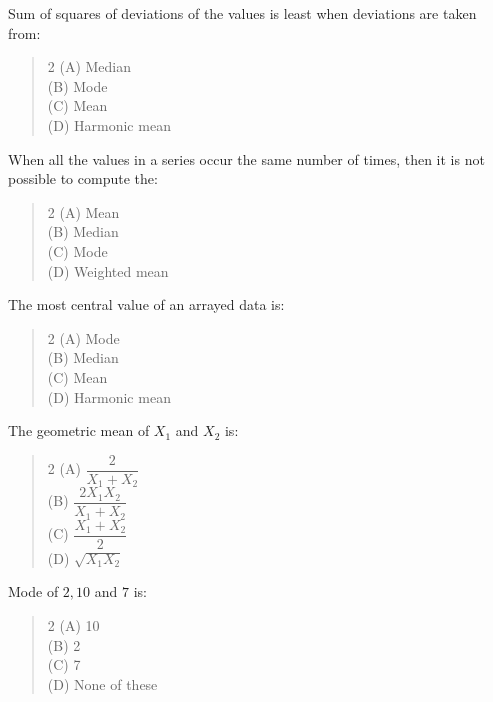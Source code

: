 \documentclass[11pt,a4paper]{article}
\begin{document}
\begin{mcqlist}
\item Sum of squares of deviations of the values is least when deviations are taken from:
\begin{quote}\begin{multicols}{2}
\noindent (A) Median \\
(B) Mode \\
(C) Mean \\
(D) Harmonic mean
\end{multicols}\end{quote}

\item When all the values in a series occur the same number of times, then it is not possible to compute the:
\begin{quote}\begin{multicols}{2}
\noindent (A) Mean \\
(B) Median \\
(C) Mode \\
(D) Weighted mean
\end{multicols}\end{quote}

\item The most central value of an arrayed data is:
\begin{quote}\begin{multicols}{2}
\noindent (A) Mode \\
(B) Median \\
(C) Mean \\
(D) Harmonic mean
\end{multicols}\end{quote}

\item The geometric mean of $X_1$ and $X_2$ is:
\begin{quote}\begin{multicols}{2}
\noindent (A) $\dfrac{2}{X_1+X_2}$ \\
(B) $\dfrac{2X_1X_2}{X_1+X_2}$ \\
(C) $\dfrac{X_1+X_2}{2}$ \\
(D) $\sqrt{X_1X_2}$
\end{multicols}\end{quote}

\item Mode of $2, 10$ and $7$ is:
\begin{quote}\begin{multicols}{2}
\noindent (A) 10 \\
(B) 2 \\
(C) 7 \\
(D) None of these
\end{multicols}\end{quote}


\end{mcqlist}
\end{document}
